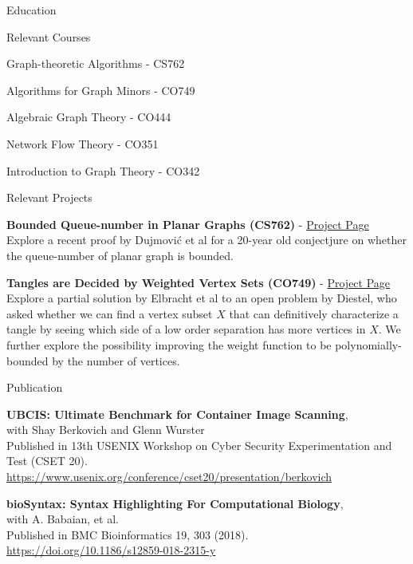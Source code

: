 \documentclass{cv}
\begin{document}
\begin{rSection}{Education}
\begin{rSubsection}{Relevant Courses}{}{}{}
	\item Graph-theoretic Algorithms - CS762
	\item Algorithms for Graph Minors - CO749
	\item Algebraic Graph Theory - CO444
	\item Network Flow Theory - CO351
	\item Introduction to Graph Theory - CO342
\end{rSubsection}

\begin{rSubsection}{Relevant Projects}{}{}{}
	\item \textbf{Bounded Queue-number in Planar Graphs (CS762)} - \href{https://jeffreyhykam.com/writings/}{Project Page}\\
	Explore a recent proof by Dujmovi\'{c} et al for a 20-year old conjectjure on whether the queue-number of planar graph is bounded. 
	\item \textbf{Tangles are Decided by Weighted Vertex Sets (CO749)} - \href{https://jeffreyhykam.com/writings/}{Project Page}\\
	Explore a partial solution by Elbracht et al to an open problem by Diestel, who asked whether we can find a vertex subset $X$ that can definitively characterize a tangle by seeing which side of a low order separation has more vertices in $X$. We further explore the possibility improving the weight function to be polynomially-bounded by the number of vertices.
\end{rSubsection}
\end{rSection}

\begin{rSection}{Publication}
\begin{rSubsectionPure}
	\item \textbf{{UBCIS}: Ultimate Benchmark for Container Image Scanning}, \\
	with Shay Berkovich and Glenn Wurster \\
	Published in 13th {USENIX} Workshop on Cyber Security Experimentation and Test ({CSET} 20). \\
	\href{https://www.usenix.org/conference/cset20/presentation/berkovich}{https://www.usenix.org/conference/cset20/presentation/berkovich}
\end{rSubsectionPure}

\begin{rSubsectionPure}
	\item \textbf{bioSyntax: Syntax Highlighting For Computational Biology}, \\
	with A. Babaian, et al. \\
	Published in BMC Bioinformatics 19, 303 (2018). \\
	\href{https://doi.org/10.1186/s12859-018-2315-y}{https://doi.org/10.1186/s12859-018-2315-y}
\end{rSubsectionPure}
\end{rSection}
\end{document}
